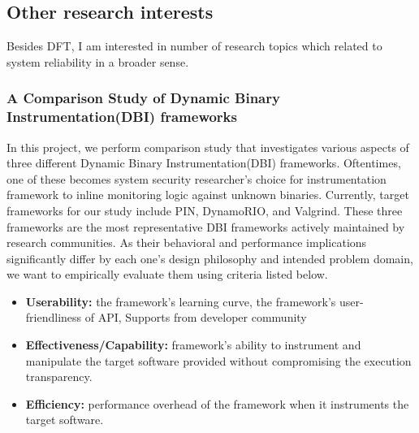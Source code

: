 \documentclass[letterpaper, 10pt]{article}
\begin{document}
\begin{small}
\subsection*{Other research interests} 
%
Besides DFT, I am interested in number of research topics which related to
system reliability in a broader sense.

\subsubsection*{A Comparison Study of Dynamic Binary Instrumentation(DBI)
frameworks}
%
In this project, we perform comparison study that investigates various aspects
of three different Dynamic Binary Instrumentation(DBI) frameworks. Oftentimes,
one of these becomes system security researcher's choice for instrumentation
framework to inline monitoring logic against unknown binaries. Currently,
target frameworks for our study include PIN, DynamoRIO, and Valgrind. These
three frameworks are the most representative DBI frameworks actively maintained
by research communities. As their behavioral and performance implications
significantly differ by each one's design philosophy and intended problem
domain, we want to empirically evaluate them using criteria listed below.

\begin{itemize}
        \item {\bf Userability:} the framework's learning curve, the framework's
           user-friendliness of API, Supports from developer community 
   \item {\bf Effectiveness/Capability:} framework's ability to instrument and
            manipulate the target software provided without compromising the
            execution transparency.  
    \item {\bf Efficiency:} performance overhead of the framework when it instruments
    the target software.  
\end{itemize}

%


\end{small}
\end{document}
